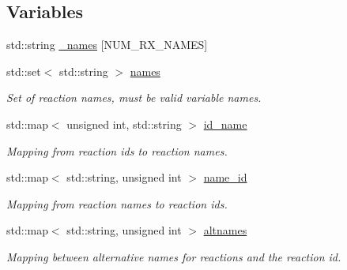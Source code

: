 \subsection*{Variables}
\begin{DoxyCompactItemize}
\item 
std\+::string \hyperlink{namespacepyne_1_1rxname_a880e1a059fe54b6fd425cc3319978555}{\+\_\+names} \mbox{[}N\+U\+M\+\_\+\+R\+X\+\_\+\+N\+A\+M\+ES\mbox{]}
\item 
\mbox{\label{namespacepyne_1_1rxname_a28dfc07e16c270b89549889be5d3146d}} 
std\+::set$<$ std\+::string $>$ \hyperlink{namespacepyne_1_1rxname_a28dfc07e16c270b89549889be5d3146d}{names}
\begin{DoxyCompactList}\small\item\em Set of reaction names, must be valid variable names. \end{DoxyCompactList}\item 
\mbox{\label{namespacepyne_1_1rxname_a28e72f5e8a19c035368e0eb72b2947d5}} 
std\+::map$<$ unsigned int, std\+::string $>$ \hyperlink{namespacepyne_1_1rxname_a28e72f5e8a19c035368e0eb72b2947d5}{id\+\_\+name}
\begin{DoxyCompactList}\small\item\em Mapping from reaction ids to reaction names. \end{DoxyCompactList}\item 
\mbox{\label{namespacepyne_1_1rxname_a615522d66adc558775f60c559b3127fe}} 
std\+::map$<$ std\+::string, unsigned int $>$ \hyperlink{namespacepyne_1_1rxname_a615522d66adc558775f60c559b3127fe}{name\+\_\+id}
\begin{DoxyCompactList}\small\item\em Mapping from reaction names to reaction ids. \end{DoxyCompactList}\item 
\mbox{\label{namespacepyne_1_1rxname_a7109ca2a2a6aea74d372262172e3a203}} 
std\+::map$<$ std\+::string, unsigned int $>$ \hyperlink{namespacepyne_1_1rxname_a7109ca2a2a6aea74d372262172e3a203}{altnames}
\begin{DoxyCompactList}\small\item\em Mapping between alternative names for reactions and the reaction id. \end{DoxyCompactList}\item 

\end{DoxyCompactItemize}
